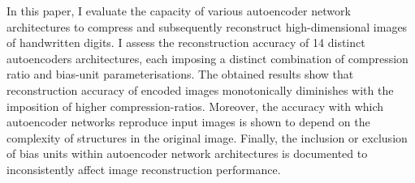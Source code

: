 

In this paper, I evaluate the capacity of various autoencoder network architectures to compress and subsequently reconstruct high-dimensional images of handwritten digits.
I assess the reconstruction accuracy of 14 distinct autoencoders architectures, each imposing a distinct combination of compression ratio and bias-unit parameterisations.
The obtained results show that reconstruction accuracy of encoded images monotonically diminishes with the imposition of higher compression-ratios.
Moreover, the accuracy with which autoencoder networks reproduce input images is shown to depend on the complexity of structures in the original image.
Finally, the inclusion or exclusion of bias units within autoencoder network architectures is documented to inconsistently affect image reconstruction performance.
